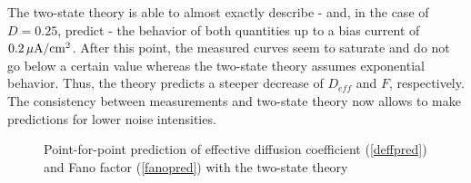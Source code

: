 \documentclass[12pt,a4paper]{article}
\begin{document}
The two-state theory is able to almost exactly describe - and, in the case of $D=0.25$, predict - the behavior of both quantities up to a bias current of $\unit[0.2]{\mu A/\text{cm}^2}$. After this point, the measured curves seem to saturate and do not go below a certain value whereas the two-state theory assumes exponential behavior. Thus, the theory predicts a steeper decrease of $D_{eff}$ and $F$, respectively. 
\\
The consistency between measurements and two-state theory
now allows to make predictions for lower noise intensities.
\begin{figure}[H]
	\hspace*{-0.5cm}
	\caption{Point-for-point prediction of effective diffusion coefficient (\ref{deffpred}) and Fano factor (\ref{fanopred}) with the two-state theory}
\end{figure}
\end{document}
